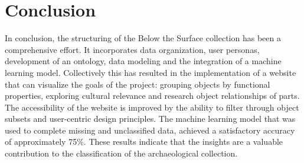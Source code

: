 \section{Conclusion}

In conclusion, the structuring of the Below the Surface collection has been a comprehensive effort. It incorporates data organization, user personas, development of an ontology, data modeling and the integration of a machine learning model. Collectively this has resulted in the implementation of a website that can visualize the goals of the project: grouping objects by functional properties, exploring cultural relevance and research object relationships of parts. The accessibility of the website is improved by the ability to filter through object subsets and user-centric design principles. The machine learning model that was used to complete missing and unclassified data, achieved a satisfactory accuracy of approximately 75\%. These results indicate that the insights are a valuable contribution to the classification of the archaeological collection.
